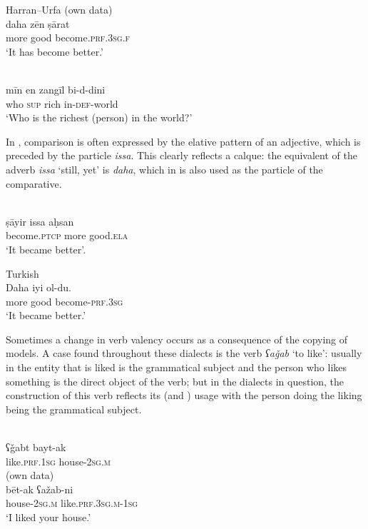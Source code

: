 \documentclass[output=paper]{langsci/langscibook}
\begin{document}
\ea 
{Harran--Urfa (own data)}\\
\gll daha zēn ṣārat\\
     more good become.\textsc{prf.3sg.f}\\
\glt ‘It has become better.’
\z

\ea 
{  \citep[155]{Procházka2002Cukurova}} \\
\gll mīn en zangīl bi-d-dini\\
     who \textsc{sup} rich in-\textsc{def}-world\\
\glt ‘Who is the richest (person) in the world?’ 
\z

In , comparison is often expressed by the {elative} pattern of an adjective, which is preceded by the particle \textit{issa}. This clearly reflects a {calque}: the  equivalent of the adverb \textit{issa} ‘still, yet’ is \textit{daha}, which in  is also used as the particle of the {comparative}. 

\ea 
{  \citep[202]{Procházka2002Cukurova}} \\
\gll ṣāyir issa aḥsan \\
     become.\textsc{ptcp} more good.\textsc{ela}\\
\glt ‘It became better’. 
\z

\ea 
{Turkish}\\
\gll Daha iyi ol-du.\\
     more good become-\textsc{prf.3sg}\\
\glt ‘It became better.’
\z

Sometimes a change in verb valency occurs as a consequence of the copying of  models. A case found throughout these dialects is the verb \textit{ʕaǧab} ‘to like’: usually in  the entity that is liked is the grammatical subject and the person who likes something is the direct object of the verb; but in the  dialects in question, the construction of this verb reflects its  (and ) usage with the person doing the liking being the grammatical subject.

\ea 
\ea {} \citep[200]{Procházka2002Cukurova}\\
   \gll ʕǧabt bayt-ak\\
     like.\textsc{prf.1sg} house-\textsc{2sg.m}\\
\ex
  (own data)\\
   \gll bēt-ak ʕažab-ni\\
     house-\textsc{2sg.m} like.\textsc{prf.3sg.m-1sg}\\
\glt ‘I liked your house.’
\z
\z
\end{document}
